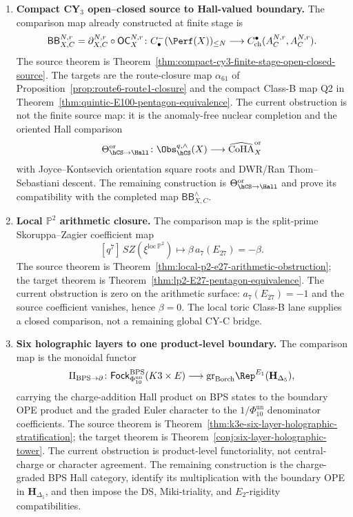 \begin{proposition}
\begin{enumerate}[label=\textup{(\arabic*)}, leftmargin=2.5em]
\item \textbf{Compact CY$_3$ open--closed source to Hall-valued boundary.}
The comparison map already constructed at finite stage is
\[
 \mathsf{BB}^{N,r}_{X,C}
 =
 \partial^{N,r}_{X,C}\circ\mathsf{OC}^{N,r}_X\colon
 C^-_\bullet(\Perf(X))_{\le N}
 \longrightarrow
 C^\bullet_{\mathrm{ch}}(A_C^{N,r},A_C^{N,r}).
\]
The source theorem is
Theorem~\ref{thm:compact-cy3-finite-stage-open-closed-source}. The
targets are the route-closure map $\alpha_{61}$ of
Proposition~\ref{prop:route6-route1-closure} and the compact Class-B map
\textup{Q2} in Theorem~\ref{thm:quintic-E100-pentagon-equivalence}. The
current obstruction is not the finite source map: it is the anomaly-free
nuclear completion and the oriented Hall comparison
\[
 \Theta_{\hCS\to\Hall}^{\mathrm{or}}\colon
 \Obs_{\hCS}^{q,\wedge}(X)\longrightarrow
 \widehat{\CoHA}_{X}^{\mathrm{or}}
\]
with Joyce--Kontsevich orientation square roots and DWR/Ran
Thom--Sebastiani descent. The remaining construction is
\(\Theta_{\hCS\to\Hall}^{\mathrm{or}}\) and prove its compatibility with
the completed map \(\mathsf{BB}^{\wedge}_{X,C}\).

\item \textbf{Local $\mathbb{P}^2$ arithmetic closure.}
The comparison map is the split-prime Skoruppa--Zagier coefficient map
\[
 [q^7]\,SZ(\xi^{\mathrm{loc}\,\mathbb P^2})
 \longmapsto
 \beta\,a_7(E_{27})=-\beta .
\]
The source theorem is
Theorem~\ref{thm:local-p2-e27-arithmetic-obstruction}; the target theorem
is Theorem~\ref{thm:lp2-E27-pentagon-equivalence}. The current
obstruction is zero on the arithmetic surface:
$a_7(E_{27})=-1$ and the source coefficient vanishes, hence
\(\beta=0\). The local toric
Class-B lane supplies a closed comparison, not a remaining
global CY-C bridge.

\item \textbf{Six holographic layers to one product-level boundary.}
The comparison map is the monoidal functor
\[
 \Pi_{\mathrm{BPS}\to\partial}\colon
 \mathsf{Fock}^{\mathrm{BPS}}_{\Phi_{10}^{\mathrm{un}}}(K3\times E)
 \longrightarrow
 \mathrm{gr}_{\mathrm{Borch}}\Rep^{E_1}(\mathbf H_{\Delta_5}),
\]
carrying the charge-addition Hall product on BPS states to the boundary
OPE product and the graded Euler character to the
\(1/\Phi_{10}^{\mathrm{un}}\) denominator coefficients. The source theorem is
Theorem~\ref{thm:k3e-six-layer-holographic-stratification}; the target
theorem is Theorem~\ref{conj:six-layer-holographic-tower}. The current
obstruction is product-level functoriality, not central-charge or
character agreement. The remaining construction is the
charge-graded BPS Hall category, identify its multiplication with the
boundary OPE in \(\mathbf H_{\Delta_5}\), and then impose the DS,
Miki-triality, and \(E_2\)-rigidity compatibilities.
\end{enumerate}
\end{proposition}

